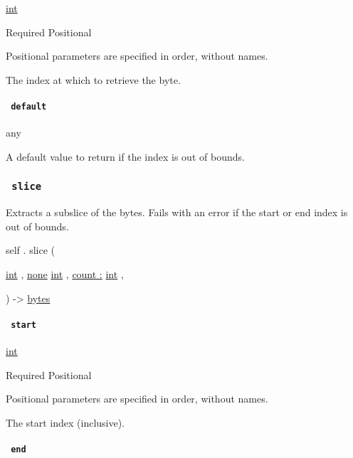 \href{/docs/reference/foundations/int/}{int}

{Required} {{ Positional }}

\label{definitions-at-index-positional-tooltip}
Positional parameters are specified in order, without names.

The index at which to retrieve the byte.

\paragraph{\texorpdfstring{\texttt{\ default\ }}{ default }}\label{definitions-at-default}

{ any }

A default value to return if the index is out of bounds.

\subsubsection{\texorpdfstring{\texttt{\ slice\ }}{ slice }}\label{definitions-slice}

Extracts a subslice of the bytes. Fails with an error if the start or
end index is out of bounds.

self { . } { slice } (

{ \href{/docs/reference/foundations/int/}{int} , } {
\href{/docs/reference/foundations/none/}{none}
\href{/docs/reference/foundations/int/}{int} , } {
\hyperref[definitions-slice-parameters-count]{count :}
\href{/docs/reference/foundations/int/}{int} , }

) -\textgreater{} \href{/docs/reference/foundations/bytes/}{bytes}

\paragraph{\texorpdfstring{\texttt{\ start\ }}{ start }}\label{definitions-slice-start}

\href{/docs/reference/foundations/int/}{int}

{Required} {{ Positional }}

\label{definitions-slice-start-positional-tooltip}
Positional parameters are specified in order, without names.

The start index (inclusive).

\paragraph{\texorpdfstring{\texttt{\ end\ }}{ end }}\label{definitions-slice-end}

